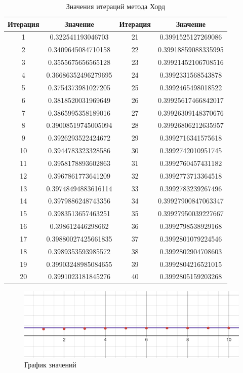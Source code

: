 \documentclass{article}
\begin{document}
\begin{table}[h!]
\centering
\begin{tabular}{|c|c|c|c|}
\hline
Итерация & Значение & Итерация & Значение \\
\hline
1 & 0.322541193046703 & 21 & 0.3991525127269086 \\
\hline
2 & 0.3409645084710158 & 22 & 0.39918859088335995 \\
\hline
3 & 0.3555675656565128 & 23 & 0.39921452106708516 \\
\hline
4 & 0.36686352496279695 & 24 & 0.3992331568543878 \\
\hline
5 & 0.3754373981027205 & 25 & 0.3992465498018522 \\
\hline
6 & 0.3818520031969649 & 26 & 0.39925617466842017 \\
\hline
7 & 0.3865995358189016 & 27 & 0.39926309148370676 \\
\hline
8 & 0.39008519745005094 & 28 & 0.39926806212635957 \\
\hline
9 & 0.3926293522424672 & 29 & 0.3992716341575618 \\
\hline
10 & 0.3944783323328586 & 30 & 0.3992742010951745 \\
\hline
11 & 0.3958178893602863 & 31 & 0.3992760457431182 \\
\hline
12 & 0.3967861773641209 & 32 & 0.3992773713364518 \\
\hline
13 & 0.39748494883616114 & 33 & 0.3992783239267496 \\
\hline
14 & 0.3979886248743356 & 34 & 0.39927900847063347 \\
\hline
15 & 0.3983513657463251 & 35 & 0.39927950039227667 \\
\hline
16 & 0.398612446298662 & 36 & 0.3992798538929168 \\
\hline
17 & 0.39880027425661835 & 37 & 0.3992801079224546 \\
\hline
18 & 0.3989353593985572 & 38 & 0.3992802904708603 \\
\hline
19 & 0.39903248985084655 & 39 & 0.3992804216521015 \\
\hline
20 & 0.3991023181845276 & 40 & 0.3992805159203268 \\
\hline
\end{tabular}
\caption{Значения итераций метода Хорд}
\end{table}


\begin{figure}[H]
    \centering
    \includegraphics[width=\textwidth]{lab_7_2.png}
    \caption{График значений}
    \label{fig:my_label}
\end{figure}
\end{document}
